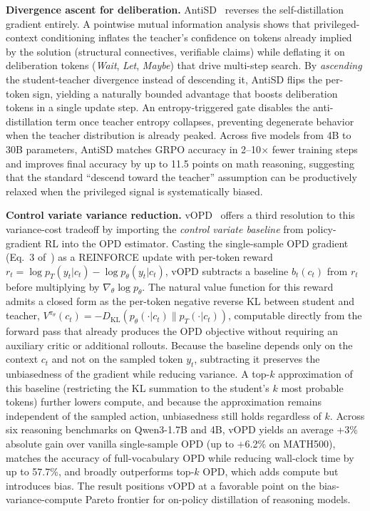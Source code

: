 \documentclass{article} %
\newcommand{\KL}{D_{\mathrm{KL}}}
\newcommand{\ptheta}{p_\theta}
\newcommand{\pteacher}{p_T}
\begin{document}
\textbf{Divergence ascent for deliberation.} AntiSD~\citep{2605.11609} reverses the self-distillation gradient entirely. A pointwise mutual information analysis shows that privileged-context conditioning inflates the teacher's confidence on tokens already implied by the solution (structural connectives, verifiable claims) while deflating it on deliberation tokens (\textit{Wait}, \textit{Let}, \textit{Maybe}) that drive multi-step search. By \emph{ascending} the student-teacher divergence instead of descending it, AntiSD flips the per-token sign, yielding a naturally bounded advantage that boosts deliberation tokens in a single update step. An entropy-triggered gate disables the anti-distillation term once teacher entropy collapses, preventing degenerate behavior when the teacher distribution is already peaked. Across five models from 4B to 30B parameters, AntiSD matches GRPO accuracy in 2--10$\times$ fewer training steps and improves final accuracy by up to 11.5 points on math reasoning, suggesting that the standard ``descend toward the teacher'' assumption can be productively relaxed when the privileged signal is systematically biased.

\textbf{Control variate variance reduction.} vOPD~\citep{2605.07865} offers a third resolution to this variance-cost tradeoff by importing the \emph{control variate baseline} from policy-gradient RL into the OPD estimator. Casting the single-sample OPD gradient (Eq.~3 of~\citealp{2605.07865}) as a REINFORCE update with per-token reward $r_t = \log \pteacher(y_t|c_t) - \log \ptheta(y_t|c_t)$, vOPD subtracts a baseline $b_t(c_t)$ from $r_t$ before multiplying by $\nabla_\theta \log \ptheta$. The natural value function for this reward admits a closed form as the per-token negative reverse KL between student and teacher, $V^{\pi_\theta}(c_t) = -\KL(\ptheta(\cdot|c_t) \parallel \pteacher(\cdot|c_t))$, computable directly from the forward pass that already produces the OPD objective without requiring an auxiliary critic or additional rollouts. Because the baseline depends only on the context $c_t$ and not on the sampled token $y_t$, subtracting it preserves the unbiasedness of the gradient while reducing variance. A top-$k$ approximation of this baseline (restricting the KL summation to the student's $k$ most probable tokens) further lowers compute, and because the approximation remains independent of the sampled action, unbiasedness still holds regardless of $k$. Across six reasoning benchmarks on Qwen3-1.7B and 4B, vOPD yields an average +3\% absolute gain over vanilla single-sample OPD (up to +6.2\% on MATH500), matches the accuracy of full-vocabulary OPD while reducing wall-clock time by up to 57.7\%, and broadly outperforms top-$k$ OPD, which adds compute but introduces bias. The result positions vOPD at a favorable point on the bias-variance-compute Pareto frontier for on-policy distillation of reasoning models.
\end{document}
